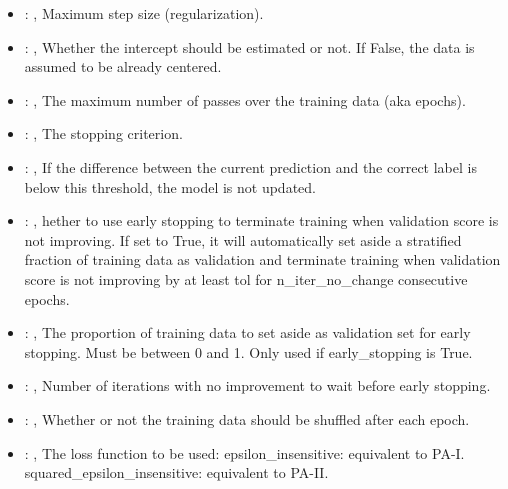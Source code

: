 \begin{itemize}
    \item {}: , 
      Maximum step size (regularization).

    \item {}: , 
      Whether the intercept should be estimated or not. If False,
      the data is assumed to be already centered.

    \item {}: , 
      The maximum number of passes over the training data (aka epochs).

    \item {}: , 
      The stopping criterion.

    \item {}: , 
      If the difference between the current prediction and the
      correct label is below this threshold, the model is not updated.

    \item {}: , 
      hether to use early stopping to terminate training when validation score is not
      improving. If set to True, it will automatically set aside a stratified fraction of training
      data as validation and terminate training when validation score is not improving by at least
      tol for n\_iter\_no\_change consecutive epochs.

    \item {}: , 
      The proportion of training data to set aside as validation set for early stopping.
      Must be between 0 and 1. Only used if early\_stopping is True.

    \item {}: , 
      Number of iterations with no improvement to wait before early stopping.

    \item {}: , 
      Whether or not the training data should be shuffled after each epoch.

    \item {}: , 
      The loss function to be used: epsilon\_insensitive: equivalent to PA-I.
      squared\_epsilon\_insensitive: equivalent to PA-II.


\end{itemize}
